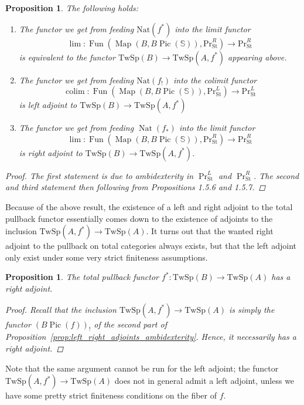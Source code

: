 \documentclass[10pt]{amsart}
\newcommand{\longto}{\longrightarrow}
\theoremstyle{plain}
\newtheorem{proposition}[theorem]{Proposition}
\theoremstyle{definition}
\DeclareMathOperator*{\colim}{colim}
\DeclareMathOperator{\Fun}{Fun}
\DeclareMathOperator{\Pic}{Pic}
\def\on{\operatorname}
\DeclareMathOperator{\Map}{Map}
\newcommand{\St}{\mathrm{St}}
\newcommand{\bS}{\mathbb{S}}
\newcommand{\TwSp}{\mathrm{TwSp}}
\begin{document}
\begin{proposition}
  The following holds:
  \begin{enumerate}
    \item The functor we get from feeding $\mathrm{Nat}(f^*)$ into the limit functor
    \[
    \lim : \Fun(\Map(B,B\Pic(\bS)),\mathrm{Pr}^{R}_{\St}) \longto \mathrm{Pr}^{R}_{\St}
    \]
    is equivalent to the functor $\TwSp(B) \to \TwSp(A,f^*)$ appearing above.
    \item The functor we get from feeding $\mathrm{Nat}(f_!)$ into the colimit functor
    \[
    \colim : \Fun(\Map(B,B\Pic(\bS)),\mathrm{Pr}^{L}_{\St}) \longto \mathrm{Pr}^{L}_{\St}
    \]
    is left adjoint to $\TwSp(B) \to \TwSp(A,f^*)$
    \item The functor we get from feeding $\on{Nat}(f_*)$ into the limit functor
    \[
    \lim : \Fun(\Map(B,B\Pic(\bS)),\mathrm{Pr}^{R}_{\St}) \longto \mathrm{Pr}^{R}_{\St}
    \]
    is right adjoint to $\TwSp(B) \to \TwSp(A,f^*)$.
  \end{enumerate}
  \begin{proof}
   The first statement is due to ambidexterity in $\Pr^{L}_{\St}$ and $\Pr^{R}_{\St}$. The second and third statement then following from Propositions 1.5.6 and 1.5.7.
  \end{proof}
\end{proposition}

Because of the above result, the existence of a left and right adjoint to the total pullback functor essentially comes down to the existence of adjoints to the inclusion $\TwSp(A,f^*) \to \TwSp(A)$.
It turns out that the wanted right adjoint to the pullback on total categories always exists, but that the left adjoint only exist under some very strict finiteness assumptions.

\begin{proposition} \label{prop:total_pullback_has_right_adjoint}
 The total pullback functor $f^* : \TwSp(B) \to \TwSp(A)$ has a right adjoint.
 \begin{proof}
Recall that the inclusion $\TwSp(A,f^*) \to \TwSp(A)$ is simply the functor $(B\Pic(f))_!$ of the second part of Proposition~\ref{prop:left_right_adjoints_ambidexterity}.
Hence, it necessarily has a right adjoint.
 \end{proof}
\end{proposition}

Note that the same argument cannot be run for the left adjoint; the functor $\TwSp(A,f^*) \to \TwSp(A)$ does not in general admit a left adjoint, unless we have some pretty strict finiteness conditions on the fiber of $f$.
\end{document}
